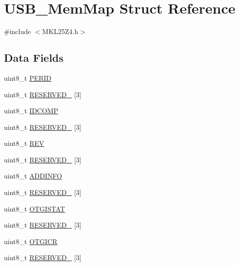 \hypertarget{struct_u_s_b___mem_map}{}\section{U\+S\+B\+\_\+\+Mem\+Map Struct Reference}
\label{struct_u_s_b___mem_map}


{\ttfamily \#include $<$M\+K\+L25\+Z4.\+h$>$}

\subsection*{Data Fields}
\begin{DoxyCompactItemize}
\item 
uint8\+\_\+t \hyperlink{struct_u_s_b___mem_map_aa3644755d5a3d7b9a8c01055452ebe39}{P\+E\+R\+ID}
\item 
uint8\+\_\+t \hyperlink{struct_u_s_b___mem_map_a4b7eb7f7cc53dc2ce43ba695fdee3ced}{R\+E\+S\+E\+R\+V\+E\+D\+\_} \mbox{[}3\mbox{]}
\item 
uint8\+\_\+t \hyperlink{struct_u_s_b___mem_map_a87d65236c6baf792a723600b0623eca5}{I\+D\+C\+O\+MP}
\item 
uint8\+\_\+t \hyperlink{struct_u_s_b___mem_map_ad2d7e12d4409f3ca3b795edc099698b0}{R\+E\+S\+E\+R\+V\+E\+D\+\_} \mbox{[}3\mbox{]}
\item 
uint8\+\_\+t \hyperlink{struct_u_s_b___mem_map_ac918187248616aac7e5223124ea9610d}{R\+EV}
\item 
uint8\+\_\+t \hyperlink{struct_u_s_b___mem_map_a0a53453a4001c42a5cceb359c68097cc}{R\+E\+S\+E\+R\+V\+E\+D\+\_} \mbox{[}3\mbox{]}
\item 
uint8\+\_\+t \hyperlink{struct_u_s_b___mem_map_aa87a73875ff45abb9b84992687f48000}{A\+D\+D\+I\+N\+FO}
\item 
uint8\+\_\+t \hyperlink{struct_u_s_b___mem_map_abc1a41779b0653a09580c6dac4e39206}{R\+E\+S\+E\+R\+V\+E\+D\+\_} \mbox{[}3\mbox{]}
\item 
uint8\+\_\+t \hyperlink{struct_u_s_b___mem_map_a6eacb73f23f815f7686f4e7bf7eb2fcc}{O\+T\+G\+I\+S\+T\+AT}
\item 
uint8\+\_\+t \hyperlink{struct_u_s_b___mem_map_ac3f90a346f328a9959bedeb9af0c48eb}{R\+E\+S\+E\+R\+V\+E\+D\+\_} \mbox{[}3\mbox{]}
\item 
uint8\+\_\+t \hyperlink{struct_u_s_b___mem_map_a4cd829d73e01b3cf0a4fa9affedb210f}{O\+T\+G\+I\+CR}
\item 
uint8\+\_\+t \hyperlink{struct_u_s_b___mem_map_a41df5454ebecece7ca24f330d3e76bcf}{R\+E\+S\+E\+R\+V\+E\+D\+\_} \mbox{[}3\mbox{]}

\end{DoxyCompactItemize}
